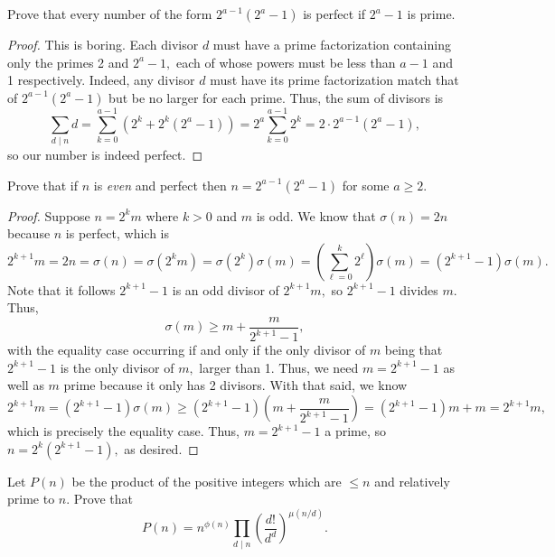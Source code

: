 \begin{exercise}
Prove that every number of the form $2^{a-1}\left(2^a-1\right)$ is perfect if $2^a-1$ is prime.
\end{exercise}

\begin{proof}
This is boring. Each divisor $d$ must have a prime factorization containing only the primes 2 and $2^a-1,$ each of whose powers must be less than $a-1$ and 1 respectively. Indeed, any divisor $d$ must have its prime factorization match that of $2^{a-1}\left(2^a-1\right)$ but be no larger for each prime. Thus, the sum of divisors is
\[\sum_{d\mid n}d=\sum_{k=0}^{a-1}\left(2^k+2^k\left(2^a-1\right)\right)=2^a\sum_{k=0}^{a-1}2^k=2\cdot2^{a-1}\left(2^a-1\right),\]
so our number is indeed perfect.
\end{proof}

\begin{exercise}
Prove that if $n$ is \textit{even} and perfect then $n=2^{a-1}\left(2^a-1\right)$ for some $a\ge2.$
\end{exercise}

\begin{proof}
Suppose $n=2^km$ where $k>0$ and $m$ is odd. We know that $\sigma(n)=2n$ because $n$ is perfect, which is
\[2^{k+1}m=2n=\sigma(n)=\sigma\left(2^km\right)=\sigma\left(2^k\right)\sigma(m)=\left(\sum_{\ell=0}^k2^\ell\right)\sigma(m)=\left(2^{k+1}-1\right)\sigma(m).\]
Note that it follows $2^{k+1}-1$ is an odd divisor of $2^{k+1}m,$ so $2^{k+1}-1$ divides $m.$ Thus,
\[\sigma(m)\ge m+\frac m{2^{k+1}-1},\]
with the equality case occurring if and only if the only divisor of $m$ being that $2^{k+1}-1$ is the only divisor of $m,$ larger than 1. Thus, we need $m=2^{k+1}-1$ as well as $m$ prime because it only has 2 divisors. With that said, we know
\[2^{k+1}m=\left(2^{k+1}-1\right)\sigma(m)\ge\left(2^{k+1}-1\right)\left(m+\frac m{2^{k+1}-1}\right)=\left(2^{k+1}-1\right)m+m=2^{k+1}m,\]
which is precisely the equality case. Thus, $m=2^{k+1}-1$ a prime, so $n=2^k\left(2^{k+1}-1\right),$ as desired.
\end{proof}

\begin{exercise}
Let $P(n)$ be the product of the positive integers which are $\le n$ and relatively prime to $n.$ Prove that
\[P(n)=n^{\phi(n)}\prod_{d\mid n}\left(\frac{d!}{d^d}\right)^{\mu(n/d)}.\]
\end{exercise}

